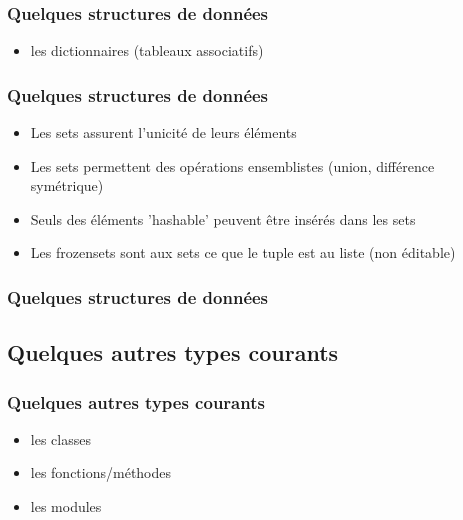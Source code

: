 \begin{frame}[fragile]
  \frametitle{Quelques structures de données}
  \begin{itemize}
    \item les dictionnaires (tableaux associatifs)
  \end{itemize}
  \begin{ipython}
\ipoutp{[('key3', 'value3'), ('key2', 'value2'),}
\ipwrapp{('key1', 'value1')]}
  \end{ipython}
\end{frame}

\begin{frame}[fragile]
  \frametitle{Quelques structures de données}
  \begin{itemize}
    \item Les sets assurent l'unicité de leurs éléments
    \item Les sets permettent des opérations ensemblistes (union, différence symétrique)
    \item Seuls des éléments 'hashable' peuvent être insérés dans les sets
    \item Les frozensets sont aux sets ce que le tuple est au liste (non éditable)
  \end{itemize}
\end{frame}

\begin{frame}[fragile]
  \frametitle{Quelques structures de données}
  \begin{ipython}
\ipoutp{set(['blue', 'green', 'yellow']])}
  \end{ipython}
\end{frame}


\subsection{Quelques autres types courants}
\begin{frame}
  \frametitle{Quelques autres types courants}
  \begin{itemize}
    \item les classes
    \item les fonctions/méthodes
    \item les modules
  \end{itemize}
\end{frame}

